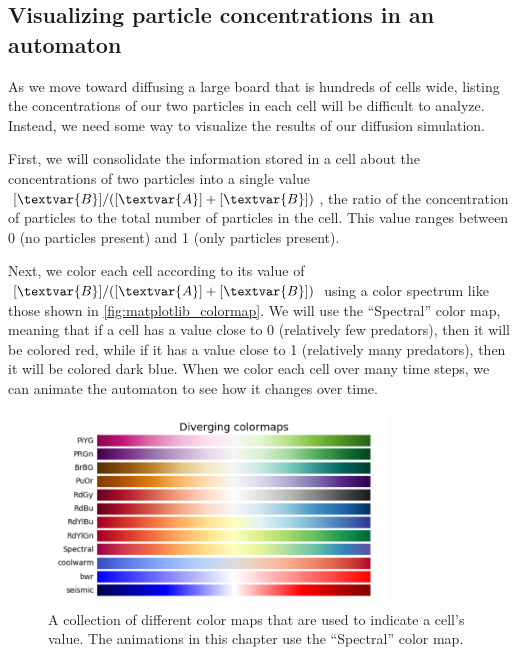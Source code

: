 \begin{qbox}[%
Update the cells in \autoref{fig:two_particle_concentration_diffusion} after another generation of diffusion. Use the diffusion rates $d_A = 0.2$ and $d_B = 0.1$.
]\end{qbox}

\FloatBarrier
{}
\subsection{Visualizing particle concentrations in an automaton}

As we move toward diffusing a large board that is hundreds of cells wide, listing the concentrations of our two particles in each cell will be difficult to analyze. Instead, we need some way to visualize the results of our diffusion simulation.

First, we will consolidate the information stored in a cell about the concentrations of two particles into a single value $[\textvar{B}]/([\textvar{A}] + [\textvar{B}])$, the ratio of the concentration of  particles to the total number of particles in the cell. This value ranges between 0 (no  particles present) and 1 (only  particles present).\\

\begin{qbox}\end{qbox}

Next, we color each cell according to its value of $[\textvar{B}]/([\textvar{A}] + [\textvar{B}])$ using a color spectrum like those shown in \autoref{fig:matplotlib_colormap}. We will use the ``Spectral'' color map, meaning that if a cell has a value close to 0 (relatively few predators), then it will be colored red, while if it has a value close to 1 (relatively many predators), then it will be colored dark blue. When we color each cell over many time steps, we can animate the automaton to see how it changes over time.\\

\begin{figure}[h]
\centering
\mySfFamily
\includegraphics[width = 0.8\textwidth]{../images/matplotlib_colormap.png}
\caption{A collection of different color maps that are used to indicate a cell's value. The animations in this chapter use the ``Spectral'' color map.}
\label{fig:matplotlib_colormap}
\end{figure}

